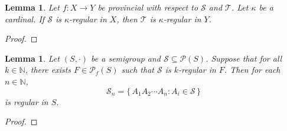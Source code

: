 \documentclass[12pt]{article}
\theoremstyle{plain}
\newtheorem{lem}[thm]{Lemma}
\theoremstyle{definition}
\newcommand{\bbN}{\mathbb{N}}
\newcommand{\calP}{\mathcal{P}}
\newcommand{\calS}{\mathcal{S}}
\newcommand{\calT}{\mathcal{T}}
\newcommand{\Pf}{\mathcal{P}_f}
\begin{document}
\begin{lem}
  Let $f \colon X \to Y$ be provincial with respect to $\calS$ and
  $\calT$.
  Let $\kappa$ be a cardinal.
  If $\calS$ is \mbox{$\kappa$-regular} in $X$, then $\calT$ is
  \mbox{$\kappa$-regular} in $Y$.
\end{lem}
\begin{proof}
  
\end{proof}

\begin{lem}
  Let $(S, \cdot)$ be a semigroup and $\calS \subseteq \calP(S)$.
  Suppose that for all $k \in \bbN$, there exists $F \in \Pf(S)$ such
  that $\calS$ is \mbox{$k$-regular} in $F$.
  Then for each $n \in \bbN$,
  \[
    \calS_n = \{\, A_1A_2 \cdots A_n : A_i \in \calS \,\}
  \]
  is regular in $S$.
\end{lem}
\begin{proof}
  
\end{proof}


\end{document}
